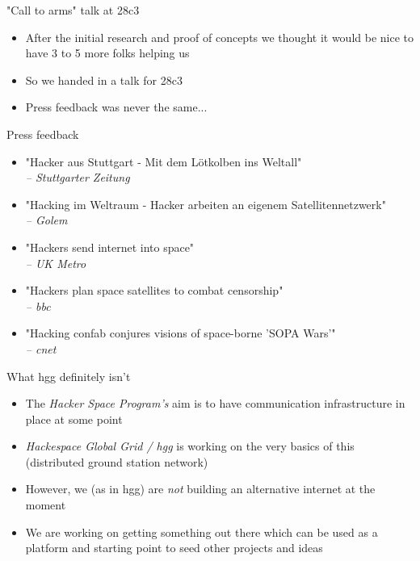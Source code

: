 	\begin{frame}{"Call to arms" talk at 28c3}
		\begin{itemize}
			\item After the initial research and proof of concepts we thought it would be nice to have 3 to 5 more folks helping us
			\item So we handed in a talk for 28c3
			\item Press feedback was never the same...
		\end{itemize}
	\end{frame}

	\begin{frame}{Press feedback}
		\begin{itemize}
			\item "Hacker aus Stuttgart - Mit dem Lötkolben ins Weltall"\\ \footnotesize{\emph{-- Stuttgarter Zeitung}}
			\item "Hacking im Weltraum - Hacker arbeiten an eigenem Satellitennetzwerk"\\ \footnotesize{\emph{-- Golem}}
			\item "Hackers send internet into space"\\ \footnotesize{\emph{-- UK Metro}}
			\item "Hackers plan space satellites to combat censorship"\\ \footnotesize{\emph{-- bbc}}
			\item "Hacking confab conjures visions of space-borne 'SOPA Wars'"\\ \footnotesize{\emph{-- cnet}}
		\end{itemize}
	\end{frame}

	\begin{frame}{What hgg definitely isn't}
		\begin{itemize}
			\item The \emph{Hacker Space Program's} aim is to have communication infrastructure in place at some point
			\item \emph{Hackespace Global Grid / hgg} is working on the very basics of this (distributed ground station network)
			\item However, we (as in hgg) are \emph{not} building an alternative internet at the moment
			\item We are working on getting something out there which can be used as a platform and starting point to seed other projects and ideas
		\end{itemize}
	\end{frame}

